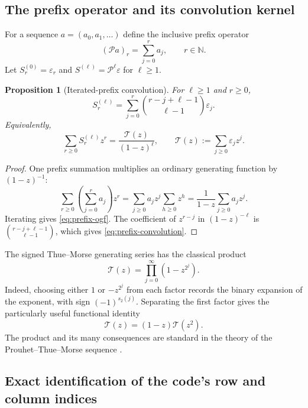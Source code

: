 \documentclass[11pt,oneside]{article}
\newtheorem{proposition}[theorem]{Proposition}
\theoremstyle{definition}
\theoremstyle{remark}
\newcommand{\N}{\mathbb N}
\newcommand{\eps}{\varepsilon}
\newcommand{\Prefix}{\mathcal P}
\newcommand{\TM}{\mathcal T}
\newcommand{\bitsum}{s_{2}}
\begin{document}
\subsection{The prefix operator and its convolution kernel}

For a sequence $a=(a_0,a_1,\ldots)$ define the inclusive prefix operator
\[
 (\Prefix a)_r=\sum_{j=0}^{r}a_j,
 \qquad r\in\N.
\]
Let $S^{(0)}_r=\eps_r$ and $S^{(\ell)}=\Prefix^\ell\eps$ for
$\ell\ge1$.

\begin{proposition}[Iterated-prefix convolution]
\label{prop:prefix-convolution}
For $\ell\ge1$ and $r\ge0$,
\begin{equation}
 S^{(\ell)}_r
   =\sum_{j=0}^{r}
      \binom{r-j+\ell-1}{\ell-1}\eps_j.
 \label{eq:prefix-convolution}
\end{equation}
Equivalently,
\begin{equation}
 \sum_{r\ge0}S^{(\ell)}_rz^r
   =\frac{\TM(z)}{(1-z)^\ell},
 \qquad
 \TM(z):=\sum_{j\ge0}\eps_jz^j.
 \label{eq:prefix-ogf}
\end{equation}
\end{proposition}

\begin{proof}
One prefix summation multiplies an ordinary generating function by
$(1-z)^{-1}$:
\[
 \sum_{r\ge0}\left(\sum_{j=0}^{r}a_j\right)z^r
 =\sum_{j\ge0}a_jz^j\sum_{h\ge0}z^h
 =\frac{1}{1-z}\sum_{j\ge0}a_jz^j.
\]
Iterating gives \eqref{eq:prefix-ogf}.  The coefficient of $z^{r-j}$ in
$(1-z)^{-\ell}$ is
$\binom{r-j+\ell-1}{\ell-1}$, which gives
\eqref{eq:prefix-convolution}.
\end{proof}

The signed Thue--Morse generating series has the classical product
\begin{equation}
 \TM(z)=\prod_{j=0}^{\infty}(1-z^{2^j}).
 \label{eq:tm-product}
\end{equation}
Indeed, choosing either $1$ or $-z^{2^j}$ from each factor records the binary
expansion of the exponent, with sign $(-1)^{\bitsum(j)}$.  Separating the
first factor gives the particularly useful functional identity
\begin{equation}
 \TM(z)=(1-z)\TM(z^2).
 \label{eq:T-functional}
\end{equation}
The product and its many consequences are standard in the theory of the
Prouhet--Thue--Morse sequence \cite{allouche-shallit-1999,automatic-sequences}.

\subsection{Exact identification of the code's row and column indices}
\end{document}
